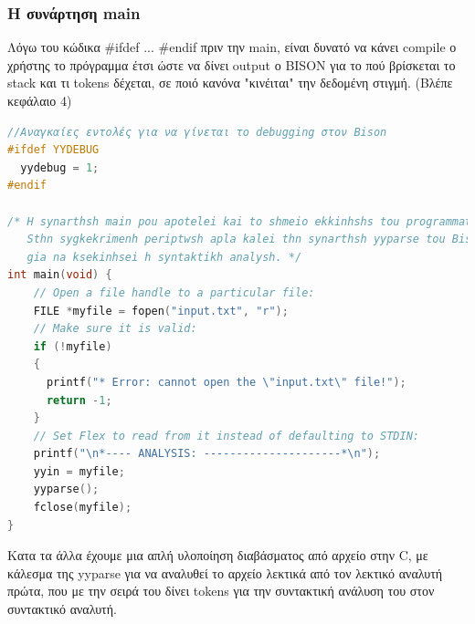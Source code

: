 \documentclass[14pt]{extarticle}
\begin{document}
\subsubsection{Η συνάρτηση main}
Λόγω του κώδικα #ifdef ... #endif πριν την main, είναι δυνατό να κάνει compile
ο χρήστης το πρόγραμμα έτσι ώστε να δίνει output ο BISON για το πού βρίσκεται το
stack και τι tokens δέχεται, σε ποιό κανόνα "κινέιται" την δεδομένη στιγμή. (Βλέπε κεφάλαιο 4)
\begin{lstlisting}[language=C]
//Αναγκαίες εντολές για να γίνεται το debugging στον Bison
#ifdef YYDEBUG
  yydebug = 1;
#endif

/* H synarthsh main pou apotelei kai to shmeio ekkinhshs tou programmatos.
   Sthn sygkekrimenh periptwsh apla kalei thn synarthsh yyparse tou Bison
   gia na ksekinhsei h syntaktikh analysh. */
int main(void) {
    // Open a file handle to a particular file:
    FILE *myfile = fopen("input.txt", "r");
    // Make sure it is valid:
    if (!myfile)
    {
      printf("* Error: cannot open the \"input.txt\" file!");
      return -1;
    }
    // Set Flex to read from it instead of defaulting to STDIN:
    printf("\n*---- ANALYSIS: ---------------------*\n");
    yyin = myfile;
    yyparse();
    fclose(myfile);
}
\end{lstlisting}
Κατα τα άλλα έχουμε μια απλή υλοποίηση διαβάσματος από αρχείο στην C, με κάλεσμα
της yyparse για να αναλυθεί το αρχείο λεκτικά από τον λεκτικό αναλυτή πρώτα, που με την σειρά
του δίνει tokens για την συντακτική ανάλυση του στον συντακτικό αναλυτή.
\end{document}
